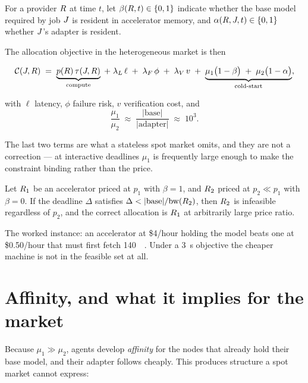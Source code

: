 \documentclass[11pt,a4paper]{article}
\begin{document}
\begin{definition}
For a provider $R$ at time $t$, let $\beta(R,t) \in \{0,1\}$
indicate whether the base model required by job $J$ is resident in
accelerator memory, and $\alpha(R,J,t) \in \{0,1\}$ whether $J$'s
adapter is resident.
\end{definition}

The allocation objective in the heterogeneous market is then

\begin{equation}
\mathcal{C}(J,R) \;=\;
\underbrace{p(R)\,\tau(J,R)}_{\text{compute}}
\;+\; \lambda_{L}\,\ell
\;+\; \lambda_{F}\,\phi
\;+\; \lambda_{V}\,v
\;+\; \underbrace{\mu_{1}\big(1-\beta\big) \;+\; \mu_{2}\big(1-\alpha\big)}_{\text{cold-start}},
\label{eq:objective}
\end{equation}

with $\ell$ latency, $\phi$ failure risk, $v$ verification cost, and
\begin{equation}
\frac{\mu_{1}}{\mu_{2}} \;\approx\; \frac{|\text{base}|}{|\text{adapter}|} \;\approx\; 10^{3}.
\end{equation}

The last two terms are what a stateless spot market omits, and they are not a
correction --- at interactive deadlines $\mu_1$ is frequently large enough to
make the constraint binding rather than the price.

\begin{proposition}
Let $R_{1}$ be an accelerator priced at $p_{1}$ with $\beta = 1$, and
$R_{2}$ priced at $p_{2} \ll p_{1}$ with $\beta = 0$. If the deadline
$\Delta$ satisfies $\Delta < |\text{base}| / \text{bw}(R_{2})$, then
$R_{2}$ is infeasible regardless of $p_{2}$, and the correct allocation is
$R_{1}$ at arbitrarily large price ratio.
\end{proposition}

The worked instance: an accelerator at \$4/hour holding the model beats one at
\$0.50/hour that must first fetch \SI{140}{\giga\byte}. Under a
\SI{3}{\second} objective the cheaper machine is not in the feasible set at all.

\section{Affinity, and what it implies for the market}

Because $\mu_{1} \gg \mu_{2}$, agents develop \emph{affinity} for the nodes that
already hold their base model, and their adapter follows cheaply. This produces
structure a spot market cannot express:
\end{document}

